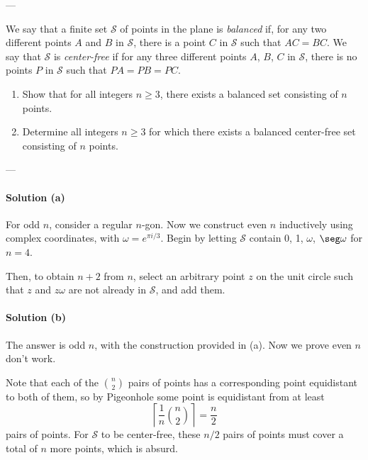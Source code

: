 
---

We say that a finite set $\mathcal S$ of points in the plane is \emph{balanced} if, for any two different points $A$ and $B$ in $\mathcal S$, there is a point $C$ in $\mathcal S$ such that $AC=BC$. We say that $\mathcal S$ is \emph{center-free} if for any three different points $A$, $B$, $C$ in $\mathcal S$, there is no points $P$ in $\mathcal S$ such that $PA=PB=PC$.
\begin{enumerate}[label=(\alph*),itemsep=0em]
    \item Show that for all integers $n\ge 3$, there exists a balanced set consisting of $n$ points.
    \item Determine all integers $n\ge 3$ for which there exists a balanced center-free set consisting of $n$ points.
\end{enumerate}

---

\paragraph{Solution (a)} For odd $n$, consider a regular $n$-gon. Now we construct even $n$ inductively using complex coordinates, with $\omega=e^{\pi i/3}$. Begin by letting $\mathcal S$ contain 0, 1, $\omega$, $\seg\omega$ for $n=4$.

Then, to obtain $n+2$ from $n$, select an arbitrary point $z$ on the unit circle such that $z$ and $z\omega$ are not already in $\mathcal S$, and add them.

\paragraph{Solution (b)} The answer is odd $n$, with the construction provided in (a). Now we prove even $n$ don't work.

Note that each of the $\binom n2$ pairs of points has a corresponding point equidistant to both of them, so by Pigeonhole some point is equidistant from at least
\[\left\lceil\frac1n\binom n2\right\rceil=\frac n2\]
pairs of points. For $\mathcal S$ to be center-free, these $n/2$ pairs of points must cover a total of $n$ more points, which is absurd.

